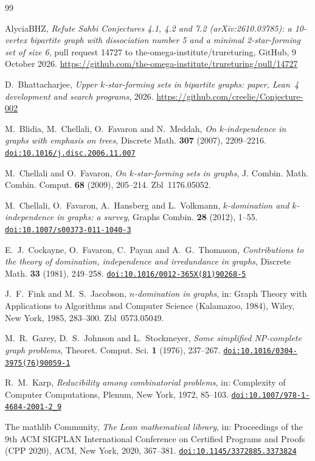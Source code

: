 \documentclass[11pt]{amsart}
\theoremstyle{definition}
\theoremstyle{remark}
\newcommand{\doi}[1]{\href{https://doi.org/#1}{\nolinkurl{doi:#1}}}
\begin{document}
\begin{thebibliography}{99}

AlyciaBHZ, \emph{Refute Sahbi Conjectures 4.1, 4.2 and 7.2 (arXiv:2610.03785): a 10-vertex bipartite graph with dissociation number 5 and a minimal 2-star-forming set of size 6}, pull request 14727 to the-omega-institute/trureturing, GitHub, 9 October 2026. \url{https://github.com/the-omega-institute/trureturing/pull/14727}

D.~Bhattacharjee, \emph{Upper $k$-star-forming sets in bipartite graphs: paper, Lean~4 development and search programs}, 2026. \url{https://github.com/creelie/Conjecture-002}

M.~Blidia, M.~Chellali, O.~Favaron and N.~Meddah, \emph{On $k$-independence in graphs with emphasis on trees}, Discrete Math. \textbf{307} (2007), 2209--2216. \doi{10.1016/j.disc.2006.11.007}

M.~Chellali and O.~Favaron, \emph{On $k$-star-forming sets in graphs}, J. Combin. Math. Combin. Comput. \textbf{68} (2009), 205--214. Zbl~1176.05052.

M.~Chellali, O.~Favaron, A.~Hansberg and L.~Volkmann, \emph{$k$-domination and $k$-independence in graphs: a survey}, Graphs Combin. \textbf{28} (2012), 1--55. \doi{10.1007/s00373-011-1040-3}

E.~J.~Cockayne, O.~Favaron, C.~Payan and A.~G.~Thomason, \emph{Contributions to the theory of domination, independence and irredundance in graphs}, Discrete Math. \textbf{33} (1981), 249--258. \doi{10.1016/0012-365X(81)90268-5}

J.~F.~Fink and M.~S.~Jacobson, \emph{$n$-domination in graphs}, in: Graph Theory with Applications to Algorithms and Computer Science (Kalamazoo, 1984), Wiley, New York, 1985, 283--300. Zbl~0573.05049.

M.~R.~Garey, D.~S.~Johnson and L.~Stockmeyer, \emph{Some simplified NP-complete graph problems}, Theoret. Comput. Sci. \textbf{1} (1976), 237--267. \doi{10.1016/0304-3975(76)90059-1}

R.~M.~Karp, \emph{Reducibility among combinatorial problems}, in: Complexity of Computer Computations, Plenum, New York, 1972, 85--103. \doi{10.1007/978-1-4684-2001-2_9}

The mathlib Community, \emph{The Lean mathematical library}, in: Proceedings of the 9th ACM SIGPLAN International Conference on Certified Programs and Proofs (CPP 2020), ACM, New York, 2020, 367--381. \doi{10.1145/3372885.3373824}


\end{thebibliography}
\end{document}
